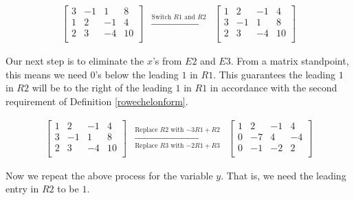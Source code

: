 \documentclass{ximera}
\begin{document}
\begin{example}
\[\begin{array}{ccc}
\left[ \begin{array}{rrr|r} 
3 & -1 & 1 & 8 \\ 
1 & 2 & -1 & 4 \\ 
2 & 3 & -4 & 10 \\ 
\end{array} \right]

& 

\xrightarrow{\text{Switch $R1$ and $R2$}}

&

\left[ \begin{array}{rrr|r}
1 & 2 & -1 & 4 \\  
3 & -1 & 1 & 8 \\ 
2 & 3 & -4 & 10 \\ 
\end{array} \right]


\end{array}\]



Our next step is to eliminate the $x$'s from $E2$ and $E3$.  From a matrix standpoint, this means we need $0$'s below the leading $1$ in $R1$.  This guarantees the leading $1$ in $R2$ will be to the right of the leading $1$ in $R1$ in accordance with the second requirement of Definition \ref{rowechelonform}.

\[\begin{array}{ccc}

\left[ \begin{array}{rrr|r}
1 & 2 & -1 & 4 \\  
3 & -1 & 1 & 8 \\ 
2 & 3 & -4 & 10 \\ 
\end{array} \right]
&
\xrightarrow[\text{Replace $R3$ with $-2R1+R3$}]{\text{Replace $R2$ with $-3R1 +R2$}} 
&
\left[ \begin{array}{rrr|r}  
1 & 2 & -1 & 4 \\  
0 & -7 & 4 & -4 \\ 
0 & -1 & -2  & 2 \\ 
\end{array} \right]



\end{array}\]

Now we repeat the above process for the variable $y$.  That is, we need the leading entry in $R2$ to be $1$.

\[\begin{array}{ccc}


\end{array}\]
\end{example}
\end{document}
